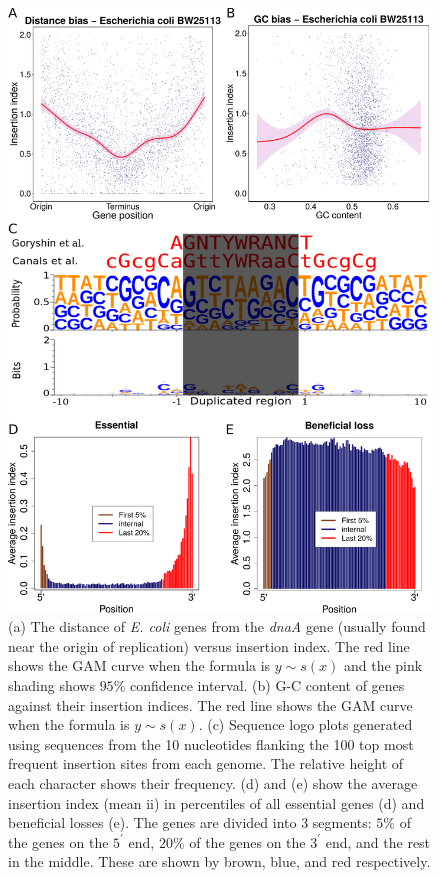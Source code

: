 \documentclass[12pt,letterpaper]{article}
\begin{document}
\begin{figure}
\includegraphics[scale=0.34]{fig3.pdf}
\caption{(a) The distance of \textit{E. coli} genes from the \textit{dnaA} gene (usually found near the origin of replication) versus insertion index. The red line shows the GAM curve when the formula is $y \sim s(x)$ and the pink shading shows $95\%$ confidence interval. (b) G-C content of genes against their insertion indices. The red line shows the GAM curve when the formula is $y \sim s(x)$. (c) Sequence logo plots generated using sequences from the 10 nucleotides flanking the 100 top most frequent insertion sites from each genome. The relative height of each character shows their frequency. (d) and (e) show the average insertion index (mean ii) in percentiles of all essential genes (d) and beneficial losses (e). The genes are divided into 3 segments: $5\%$ of the genes on the $5^\prime$ end, $20\%$ of the genes on the $3^\prime$ end, and the rest in the middle. These are shown by brown, blue, and red respectively.}
\label{fig:fig3}
\end{figure}
\end{document}

